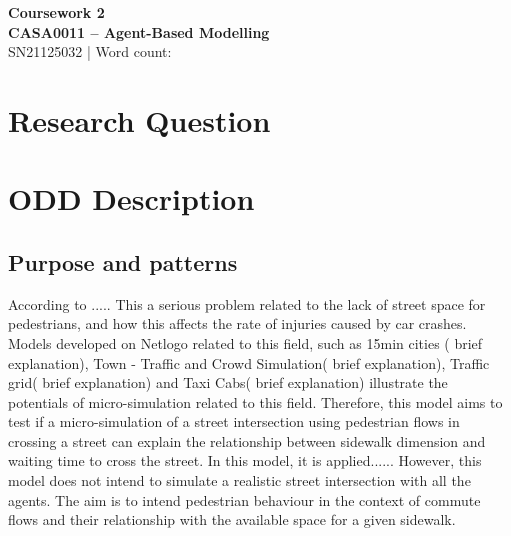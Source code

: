 \documentclass[10pt]{report}
\author{Felipe Santos Almeida}
\numberwithin{figure}{section}
\numberwithin{table}{section}
\begin{document}

\begin{center}
    \vspace*{-3cm}
\end{center}   
    {\LARGE\textbf{Coursework 2\\
    CASA0011 – Agent-Based Modelling\\}}
SN21125032 | Word count:

\vspace{5mm} %
  
\section{Research Question}

\section{ODD Description}
\subsection{Purpose and patterns}

According to ..... This a serious problem related to the lack of street space for pedestrians, and how this affects the rate of injuries caused by car crashes. Models developed on Netlogo related to this field, such as 15min cities ( brief explanation), Town - Traffic and Crowd Simulation( brief explanation), Traffic grid( brief explanation) and Taxi Cabs( brief explanation) illustrate the potentials of micro-simulation related to this field.
Therefore, this model aims to test if a micro-simulation of a street intersection using pedestrian flows in crossing a street can explain the relationship between sidewalk dimension and waiting time to cross the street. In this model, it is applied...... However, this model does not intend to simulate a realistic street intersection with all the agents. The aim is to intend pedestrian behaviour in the context of commute flows and their relationship with the available space for a given sidewalk.  
\end{document}
